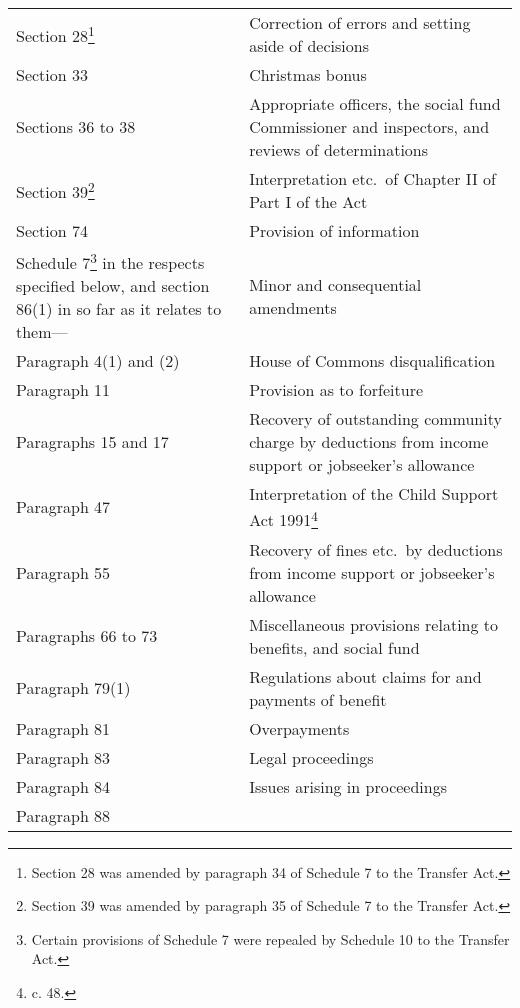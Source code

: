 \documentclass[12pt,a4paper]{article}
\begin{document}
{\begin{longtable}{p{183pt}p{183pt}}
Section 28\footnote{\frenchspacing Section 28 was amended by paragraph 34 of Schedule 7 to the Transfer Act.}	&Correction of errors and setting aside of decisions\\
Section 33	&Christmas bonus\\
Sections 36 to 38	&Appropriate officers, the social fund Commissioner and inspectors, and reviews of determinations\\
Section 39\footnote{\frenchspacing Section 39 was amended by paragraph 35 of Schedule 7 to the Transfer Act.}	&Interpretation etc.\ of Chapter II of Part I of the Act\\
Section 74	&Provision of information\\
Schedule 7\footnote{\frenchspacing Certain provisions of Schedule 7 were repealed by Schedule 10 to the Transfer Act.} in the respects specified below, and section 86(1) in so far as it relates to them---	&Minor and consequential amendments\\
\hspace{1em}    Paragraph 4(1) and (2) &
	House of Commons disqualification\\
\hspace{1em}
    Paragraph 11 &
	Provision as to forfeiture\\
\hspace{1em}
    Paragraphs 15 and 17 &
	Recovery of outstanding community charge by deductions from income support or jobseeker’s allowance\\
\hspace{1em}
    Paragraph 47 &
	Interpretation of the Child Support Act 1991\footnote{\frenchspacing 1991 c. 48.}\\
\hspace{1em}
    Paragraph 55 &
	Recovery of fines etc.\ by deductions from income support or jobseeker’s allowance\\
\hspace{1em}
    Paragraphs 66 to 73 &
	Miscellaneous provisions relating to benefits, and social fund\\
\hspace{1em}
    Paragraph 79(1) &
	Regulations about claims for and payments of benefit\\
\hspace{1em}
    Paragraph 81 &
	Overpayments\\
\hspace{1em}
    Paragraph 83 &
	Legal proceedings\\
\hspace{1em}
    Paragraph 84 &
	Issues arising in proceedings\\
\hspace{1em}
    Paragraph 88 &


\end{longtable}}
\end{document}
